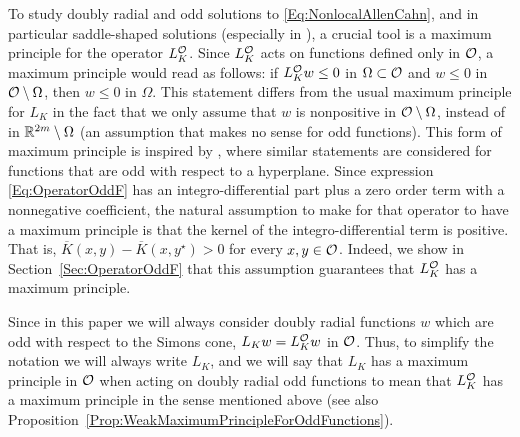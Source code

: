 To study doubly radial and odd solutions to \eqref{Eq:NonlocalAllenCahn}, and in particular saddle-shaped solutions (especially in \cite{FelipeSanz-Perela:IntegroDifferentialII}), a crucial tool is a maximum principle for the operator $L_K^{\mathcal{O}}$. Since $L_K^{\mathcal{O}}$ acts on functions defined only in $\mathcal{O}$, a maximum principle would read as follows: if $L_K^{\mathcal{O}} w \leq 0$ in $\Omega\subset \mathcal{O}$ and $w\leq 0$ in $\mathcal{O} \setminus \Omega$, then $w\leq 0$ in $\Omega$. This statement differs from the usual maximum principle for $L_K$ in the fact that we only assume that $w$ is nonpositive in $\mathcal{O}\setminus \Omega$, instead of in $\mathbb{R}^{2m}\setminus \Omega$ (an assumption that makes no sense for odd functions). This form of maximum principle is inspired by \cite{ChenLiLi, JarohsWeth}, where similar statements are considered for functions that are odd with respect to a hyperplane. Since expression \eqref{Eq:OperatorOddF} has an integro-differential part plus a zero order term with a nonnegative coefficient, the natural assumption to make for that operator to have a maximum principle is that the kernel of the integro-differential term is positive. That is, $\overline{K}(x, y) - \overline{K}(x, y^\star)>0$ for every $x,y\in \mathcal{O}$. Indeed, we show in Section~\ref{Sec:OperatorOddF} that this assumption guarantees that $L_K^{\mathcal{O}}$ has a maximum principle. 

Since in this paper we will always consider doubly radial functions $w$ which are odd with respect to the Simons cone, $L_K w =L_K^{\mathcal{O}} w$ in $\mathcal{O}$. Thus, to simplify the notation we will always write $L_K$, and we will say that $L_K$ has a maximum principle in $\mathcal{O}$ when acting on doubly radial odd functions to mean that $L_K^{\mathcal{O}}$ has a maximum principle in the sense mentioned above (see also Proposition~\ref{Prop:WeakMaximumPrincipleForOddFunctions}).

